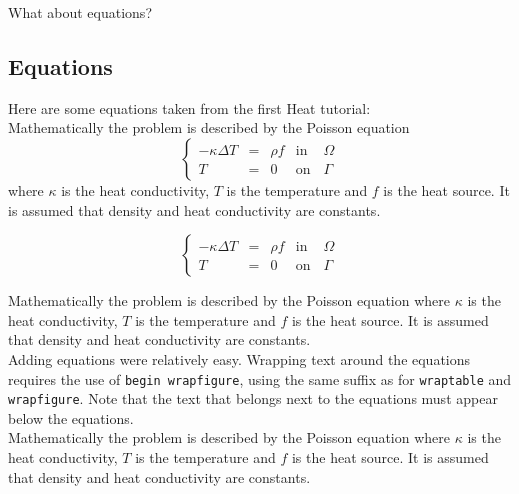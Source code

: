 What about equations?

\subsection*{Equations}

Here are some equations taken from the first Heat tutorial:\\


Mathematically the problem is described by the Poisson equation
\begin{equation}
\left \{
\begin{array}{ccccc}
- \kappa \Delta T &= &\rho f & \mathrm{ in } \, \, & \Omega \\
T&=&0 & \mathrm{ on } & \Gamma
\end{array}
\right .
\end{equation}
where $\kappa$ is the heat conductivity, $T$  is the temperature and $f$ is the heat source. It is assumed that density and heat conductivity are constants.\\

\begin{figure}
\begin{equation}
\left \{
\begin{array}{ccccc}
- \kappa \Delta T &= &\rho f & \mathrm{ in } \, \, & \Omega \\
T&=&0 & \mathrm{ on } & \Gamma
\end{array}
\right .
\end{equation}
\end{figure}

Mathematically the problem is described by the Poisson equation where $\kappa$ is the heat conductivity, $T$  is the temperature and $f$ is the heat source. It is assumed that density and heat conductivity are constants.\\

Adding equations were relatively easy.  Wrapping text around the equations requires the use of \texttt{begin wrapfigure}, using the same suffix as for \texttt{wraptable} and \texttt{wrapfigure}.  Note that the text that belongs next to the equations must appear below the equations.\\

Mathematically the problem is described by the Poisson equation where $\kappa$ is the heat conductivity, $T$  is the temperature and $f$ is the heat source. It is assumed that density and heat conductivity are constants.\\

